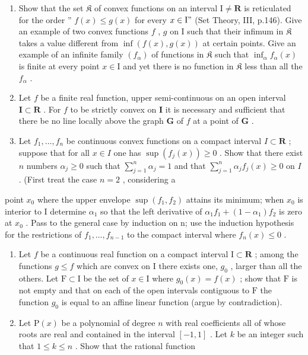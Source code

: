 \begin{enumerate}
\def\labelenumi{\arabic{enumi})}
\setcounter{enumi}{19}
\item
  Show that the set \(\mathfrak{K}\) of convex functions on an interval \(\mathrm{I} \neq \mathbf{R}\) is reticulated for the order '' \(f(x) \leqslant g(x)\) for every \(x \in \mathrm{I}"\) (Set Theory, III, p.146). Give an example of two convex functions \(f\) , \(g\) on \(\mathrm{I}\) such that their infimum in \(\mathfrak{K}\) takes a value different from \(\inf(f(x), g(x))\) at certain points. Give an example of an infinite family \((f_{\alpha})\) of functions in \(\mathfrak{K}\) such that \(\inf_{\alpha} f_{\alpha}(x)\) is finite at every point \(x \in \mathrm{I}\) and yet there is no function in \(\mathfrak{K}\) less than all the \(f_{\alpha}\) .
\item
  Let \(f\) be a finite real function, upper semi-continuous on an open interval \(\mathbf{I} \subset \mathbf{R}\) . For \(f\) to be strictly convex on \(\mathbf{I}\) it is necessary and sufficient that there be no line locally above the graph \(\mathbf{G}\) of \(f\) at a point of \(\mathbf{G}\) .
\item
  Let \(f_{1}, \ldots, f_{n}\) be continuous convex functions on a compact interval \(I \subset \mathbf{R}\) ; suppose that for all \(x \in I\) one has \(\sup(f_{j}(x)) \geqslant 0\) . Show that there exist \(n\) numbers \(\alpha_{j} \geqslant 0\) such that \(\sum_{j=1}^{n} \alpha_{j} = 1\) and that \(\sum_{j=1}^{n} \alpha_{j} f_{j}(x) \geqslant 0\) on \(I\) . (First treat the case \(n = 2\) , considering a
\end{enumerate}

point \(x_{0}\) where the upper envelope \(\sup(f_{1}, f_{2})\) attains its minimum; when \(x_{0}\) is interior to I determine \(\alpha_{1}\) so that the left derivative of \(\alpha_{1}f_{1} + (1 - \alpha_{1})f_{2}\) is zero at \(x_{0}\) . Pass to the general case by induction on n; use the induction hypothesis for the restrictions of \(f_{1}, \ldots, f_{n-1}\) to the compact interval where \(f_{n}(x) \leqslant 0\) .

\begin{enumerate}
\def\labelenumi{\arabic{enumi})}
\setcounter{enumi}{22}
\item
  Let \(f\) be a continuous real function on a compact interval \(\mathrm{I} \subset \mathbf{R}\) ; among the functions \(g \leqslant f\) which are convex on \(\mathrm{I}\) there exists one, \(g_0\) , larger than all the others. Let \(\mathrm{F} \subset \mathrm{I}\) be the set of \(x \in \mathrm{I}\) where \(g_0(x) = f(x)\) ; show that \(\mathrm{F}\) is not empty and that on each of the open intervals contiguous to \(\mathrm{F}\) the function \(g_0\) is equal to an affine linear function (argue by contradiction).
\item
  Let \(\mathrm{P}(x)\) be a polynomial of degree \(n\) with real coefficients all of whose roots are real and contained in the interval \([-1, 1]\) . Let \(k\) be an integer such that \(1 \leqslant k \leqslant n\) . Show that the rational function
\end{enumerate}

